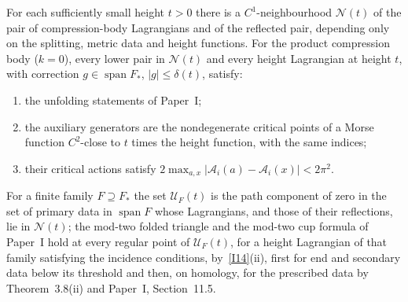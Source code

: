 \documentclass[11pt]{amsart}
\theoremstyle{definition}
\theoremstyle{remark}
\theoremstyle{plain}
\numberwithin{equation}{section}
\begin{document}
\begin{enumerate}[label=(I\arabic*),ref=(I\arabic*)]
For each sufficiently small height $t>0$ there is a $C^1$-neighbourhood
$\mathcal N(t)$ of the pair of compression-body Lagrangians and of the
reflected pair, depending only on the splitting, metric data and height
functions. For the product compression body ($k=0$), every lower pair in
$\mathcal N(t)$ and every height Lagrangian at height $t$, with correction
$g\in\operatorname{span}F_*$, $|g|\le\delta(t)$, satisfy:
\begin{enumerate}[label=(\alph*)]
\item the unfolding statements of Paper~I;
\item the auxiliary generators are the nondegenerate critical points
  of a Morse function $C^2$-close to $t$ times the height function,
  with the same indices;
\item their critical actions satisfy
  $2\max_{a,x}|\mathcal A_i(a)-\mathcal A_i(x)|<2\pi^2$.
\end{enumerate}
For a finite family $F\supseteq F_*$ the set $\mathcal U_F(t)$ is the path
component of zero in the set of primary data in $\operatorname{span}F$ whose Lagrangians, and
those of their reflections, lie in $\mathcal N(t)$; the mod-two folded triangle and the mod-two
cup formula of Paper~I hold at every regular point of $\mathcal U_F(t)$, for a height Lagrangian
of that family satisfying the incidence conditions, by~\ref{I14}(ii), first for end and secondary
data below its threshold and then, on homology, for the prescribed data by Theorem~3.8(ii) and
Paper~I, Section~11.5.


\end{enumerate}
\end{document}
